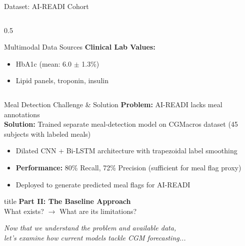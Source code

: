\documentclass[aspectratio=169,xcolor=dvipsnames]{beamer}
\begin{document}
\begin{frame}{Dataset: AI-READI Cohort}
\begin{columns}
\begin{column}{0.5\textwidth}
\begin{block}{Multimodal Data Sources}
                \vspace{0.05em}
                \textbf{Clinical Lab Values:}
                \begin{itemize}
                    \item HbA1c (mean: 6.0 $\pm$ 1.3\%)
                    \item Lipid panels, troponin, insulin
                \end{itemize}
            \end{block}
        \end{column}
    \end{columns}
\end{frame}

\begin{frame}
    \vspace{0.5em}
    \begin{block}{Meal Detection Challenge \& Solution}
        \textbf{Problem:} AI-READI lacks meal annotations \\
        \textbf{Solution:} Trained separate meal-detection model on CGMacros dataset (45 subjects with labeled meals)
        \begin{itemize}
            \item Dilated CNN + Bi-LSTM architecture with trapezoidal label smoothing
            \item \textbf{Performance:} 80\% Recall, 72\% Precision (sufficient for meal flag proxy)
            \item Deployed to generate predicted meal flags for AI-READI
        \end{itemize}
    \end{block}
\end{frame}

\begin{frame}[plain]
    \centering
    \vfill
    \begin{beamercolorbox}[center,shadow=true,rounded=true]{title}
        \textbf{Part II: The Baseline Approach}\\
        \vspace{0.5em}
        \large What exists? $\to$ What are its limitations?
    \end{beamercolorbox}
    \vfill
    
    \vspace{1em}
    \normalsize
    \textit{Now that we understand the problem and available data,\\
    let's examine how current models tackle CGM forecasting...}
\end{frame}
\end{document}
